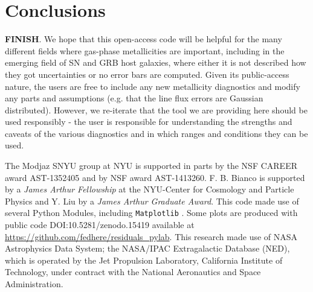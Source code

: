 \documentclass{emulateapj}
\begin{document}
\section{Conclusions}\label{conclusions_sec}

 \textbf{FINISH}. We hope that this open-access code will be helpful for the many different fields where gas-phase metallicities are important, including in the emerging field of SN and GRB host galaxies, where either it is not described how they got uncertainties or no error bars are computed. Given its public-access nature, the users are free to include any new metallicity diagnostics and modify any parts and assumptions (e.g. that the line flux errors are Gaussian distributed). However, we re-iterate that the tool we are providing here should be used responsibly - the user is responsible for understanding the strengths and caveats of the various diagnostics and in which ranges and conditions they can be used.

\acknowledgements
The Modjaz SNYU group at NYU is supported in parts by the NSF CAREER award AST-1352405 and by NSF award AST-1413260. F. B. Bianco is supported by a \emph{James Arthur Fellowship} at the NYU-Center for Cosmology and Particle Physics and Y. Liu by a \emph{James Arthur Graduate Award}.
This code made use of  several Python Modules, including \verb=Matplotlib= \citep{hunter07}.
Some plots are  produced with public code DOI:10.5281/zenodo.15419 available at \url{https://github.com/fedhere/residuals_pylab}.
This research made use of NASA Astrophysics Data
System; the NASA/IPAC Extragalactic Database (NED), which
is operated by the Jet Propulsion Laboratory, California Institute
of Technology, under contract with the National Aeronautics
and Space Administration.








%
\end{document}
